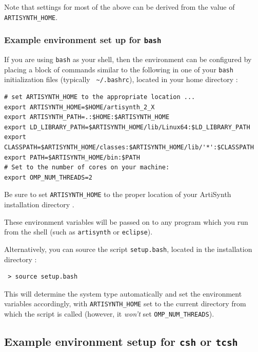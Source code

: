 \documentclass{article}
\def\directory{directory }
\begin{document}

Note that settings for most of the above can be derived from the value
of {\tt ARTISYNTH\_HOME}.

\subsubsection{Example environment set up for {\tt bash}}
\label{BashEnvironmentSetup}

If you are using {\tt bash} as your shell, then the environment can be
configured by placing a block of commands similar to the following in
one of your {\tt bash} initialization files (typically {\tt
\textasciitilde/.bashrc}), located in your home \directory:

\begin{lstlisting}
# set ARTISYNTH_HOME to the appropriate location ...
export ARTISYNTH_HOME=$HOME/artisynth_2_X
export ARTISYNTH_PATH=.:$HOME:$ARTISYNTH_HOME
export LD_LIBRARY_PATH=$ARTISYNTH_HOME/lib/Linux64:$LD_LIBRARY_PATH
export CLASSPATH=$ARTISYNTH_HOME/classes:$ARTISYNTH_HOME/lib/'*':$CLASSPATH
export PATH=$ARTISYNTH_HOME/bin:$PATH
# Set to the number of cores on your machine:
export OMP_NUM_THREADS=2 
\end{lstlisting}

Be sure to set {\tt ARTISYNTH\_HOME} to the proper location of your
ArtiSynth installation \directory.

These environment variables will be passed on to any program which you
run from the shell (such as {\tt artisynth} or {\tt eclipse}).

Alternatively, you can source the script {\tt setup.bash}, located in
the installation \directory:

\begin{verbatim}
 > source setup.bash
\end{verbatim}

This will determine the system type automatically and set the
environment variables accordingly, with {\tt ARTISYNTH\_HOME} set to the
current \directory from which the script is called (however,
it {\it won't} set {\tt OMP\_NUM\_THREADS}).

\subsection{Example environment setup for {\tt csh} or {\tt tcsh}}
\label{CshEnvironmentSetup}
\end{document}
